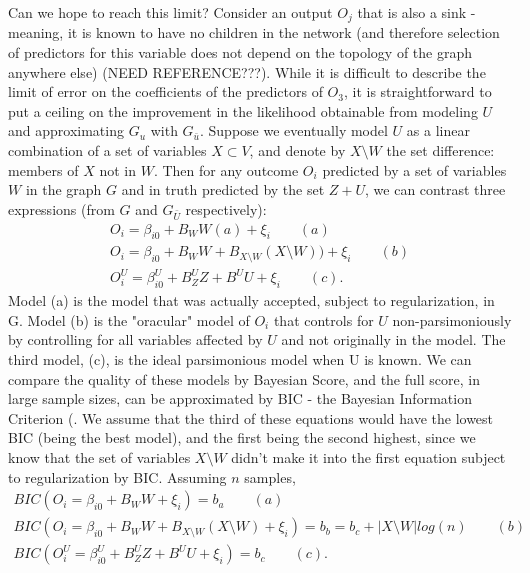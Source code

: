 \documentclass{article}
\begin{document}
Can we hope to reach this limit?  Consider an output $O_j$ that is also a sink - meaning, it is known to have no children in the network (and therefore selection of predictors for this variable does not depend on the topology of the graph anywhere else) (NEED REFERENCE???).  While it is difficult to describe the limit of error on the coefficients of the predictors of $O_3$, it is straightforward to put a ceiling on the improvement in the likelihood obtainable from modeling $U$ and approximating $G_u$ with $G_{\bar{u}}$.  Suppose we eventually model $U$ as a linear combination of a set of variables $X \subset V$, and denote by $X \setminus W$ the set difference: members of $X$ not in $W$.  Then for any outcome $O_i$ predicted by a set of variables $W$ in the graph $G$ and in truth predicted by the set $Z + U$, we can contrast three expressions (from $G$ and $G_{\bar{U}}$ respectively):
\begin{equation}
\begin{split}
O_i = \beta_{i0} + B_W W (a) + \xi_i \qquad (a)\\
O_i = \beta_{i0} + B_W W + B_{X \setminus W} (X \setminus W)) + \xi_i \qquad (b)\\
O_i^U = \beta_{i0}^U + B_Z^U Z + B^U U + \xi_i \qquad (c).
\end{split}
\end{equation}
Model (a) is the model that was actually accepted, subject to regularization, in G.  Model (b) is the "oracular" model of $O_i$ that controls for $U$ non-parsimoniously by controlling for all variables affected by $U$ and not originally in the model.  The third model, (c), is the ideal parsimonious model when U is known.  We can compare the quality of these models by Bayesian Score, and the full score, in large sample sizes, can be approximated by BIC - the Bayesian Information Criterion (\cite{koller_probabilistic_2009}.  We assume that the third of these equations would have the lowest BIC (being the best model), and the first being the second highest, since we know that the set of variables $X \setminus W$ didn't make it into the first equation subject to regularization by BIC.  Assuming $n$ samples,
\begin{equation}
\begin{split}
BIC(O_i = \beta_{i0} + B_W W + \xi_i) = b_a \qquad (a)\\
BIC(O_i = \beta_{i0} + B_W W + B_{X \setminus W} (X \setminus W) + \xi_i) = b_b = b_c + |X \setminus W| log(n) \qquad (b)\\
BIC(O_i^U = \beta_{i0}^U + B_Z^U Z + B^U U + \xi_i) = b_c \qquad (c).
\end{split}
\label{eq:ceilingTheoremPrep}
\end{equation}
\end{document}
